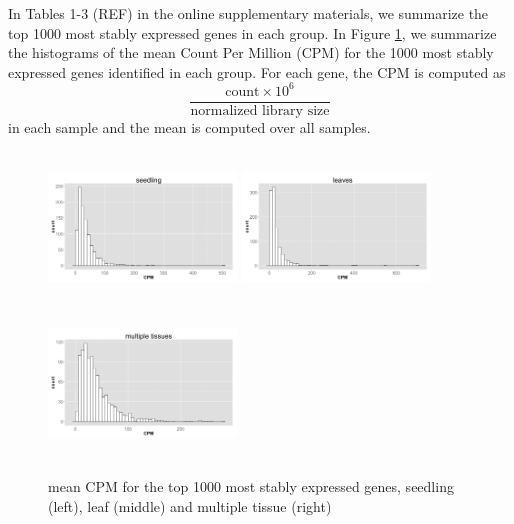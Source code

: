 \documentclass[11pt, a4paper]{article}
\begin{document}
In Tables 1-3 (REF) in the online supplementary materials, we summarize the
top 1000 most stably expressed genes in each group.  In Figure \ref{cpm}, we
summarize the histograms of the mean Count Per Million (CPM) for the 1000
most stably expressed genes identified in each group. For each gene, the CPM
is computed as \[ \dfrac{ \text{count} \times 10^6 }{ \text{normalized library
size}} \] in each sample and the mean is computed over all samples.
 
\begin{figure}[] \begin{center}
    \includegraphics[width=5cm,height=4cm]{Figures/cpm_seedling.png}
    \includegraphics[width=5cm,height=4cm]{Figures/cpm_leaves.png}
    \includegraphics[width=5cm,height=4cm]{Figures/cpm_tissue.png}
    \caption{{\small{\label{cpm} mean CPM for the top 1000 most stably
    expressed genes, seedling (left), leaf (middle) and multiple tissue
    (right) }}} \end{center} 
\end{figure} 
\end{document}
